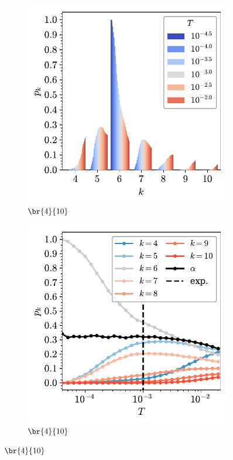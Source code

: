 \begin{figure}[bt]
     \begin{subfigure}[b]{0.45\textwidth}
         \centering
         \includegraphics[width=\textwidth]{./figures/bilayers/triraft_410.pdf}
         \caption{$\br{4}{10}$}
         \label{fig:trpk3}
     \end{subfigure}
     \hfill
	\begin{subfigure}[b]{0.45\textwidth}
         \centering
         \includegraphics[width=\textwidth]{./figures/bilayers/triraft_line_410.pdf}
         \caption{$\br{4}{10}$}
         \label{fig:trpk4}
     \end{subfigure}
     \hfill
   

\end{figure}
